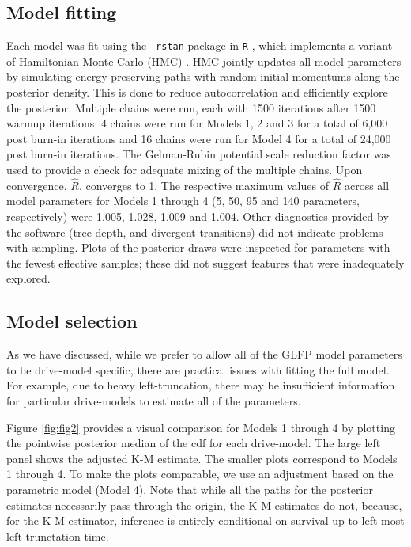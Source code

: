 \documentclass[12pt]{article}
\begin{document}
\subsection{Model fitting}
\label{sec:Model fitting}
Each model was fit using the {\tt
  rstan} \citep{rstan} package in {\tt R} \citep{r}, which implements a variant of Hamiltonian Monte Carlo (HMC)
\citep{betancourt}. HMC jointly updates all model parameters by simulating energy preserving paths with random initial momentums along the posterior density. This is done to reduce autocorrelation and efficiently explore the posterior. Multiple chains were run, each with 1500 iterations after 1500 warmup iterations: 4 chains were run for Models 1, 2 and 3 for a total of 6,000 post burn-in iterations and 16 chains were run for Model 4 for a total of 24,000 post burn-in iterations. The Gelman-Rubin potential scale reduction factor was used to provide a check for adequate mixing of the multiple chains. Upon convergence, $\hat{R}$, converges to 1.  The  respective maximum values of $\hat{R}$ across all model parameters for Models 1 through 4 (5, 50, 95 and 140 parameters, respectively) were 1.005, 1.028, 1.009 and 1.004. Other diagnostics provided by the software (tree-depth, and divergent transitions) did not indicate problems with sampling. Plots of the posterior draws were inspected for parameters with the fewest effective samples; these did not suggest features that were inadequately explored.



\subsection{Model selection}
\label{sec:Model Comparisons}
As we have discussed, while we prefer to allow all of the GLFP model parameters to be drive-model specific, there are practical issues with fitting the full model. For example, due to heavy left-truncation, there may be insufficient information for particular drive-models to estimate all of the parameters. 

Figure \ref{fig:fig2} provides a visual comparison for Models 1 through 4 by plotting the pointwise posterior median of the cdf for each drive-model.  The large left panel shows the adjusted K-M estimate.  The smaller plots correspond to Models 1 through 4.  To make the plots comparable, we use an adjustment based on the parametric model (Model 4).  Note that while all the paths for the posterior estimates necessarily pass through the origin, the K-M estimates do not, because, for the K-M estimator, inference is entirely conditional on survival up to left-most left-trunctation time.
\end{document}

